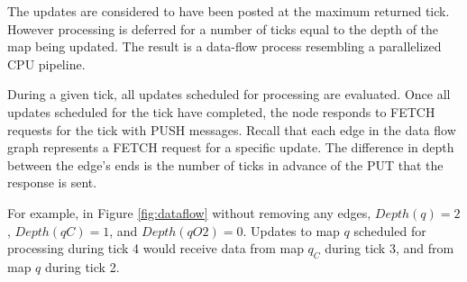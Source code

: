 The updates are considered to have been posted at the maximum returned tick.  However processing is deferred for a number of ticks equal to the depth of the map being updated.  The result is a data-flow process resembling a parallelized CPU pipeline.

During a given tick, all updates scheduled for processing are evaluated.  Once all updates scheduled for the tick have completed, the node responds to FETCH requests for the tick with PUSH messages.  Recall that each edge in the data flow graph represents a FETCH request for a specific update.  The difference in depth between the edge's ends is the number of ticks in advance of the PUT that the response is sent.  

For example, in Figure \ref{fig:dataflow} without removing any edges,
$Depth(q) = 2$, $Depth(qC) = 1$, and $Depth(qO2) = 0$.  Updates to map $q$ scheduled for processing during tick 4 would receive data from map $q_C$ during tick 3, and from map $q$ during tick 2.

